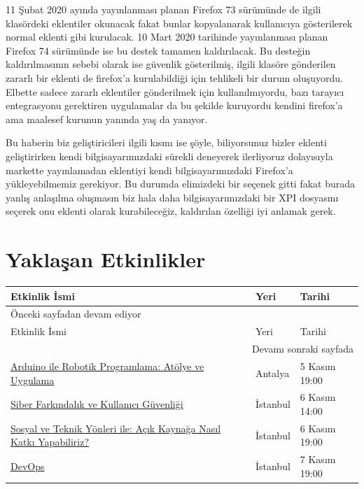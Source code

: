 \documentclass[11pt]{article}
\begin{document}
11 Şubat 2020 ayında yayınlanması planan Firefox 73 sürümünde de ilgili
klasördeki eklentiler okunacak fakat bunlar kopyalanarak kullanıcıya
gösterilerek normal eklenti gibi kurulacak. 10 Mart 2020 tarihinde
yayınlanması planan Firefox 74 sürümünde ise bu destek tamamen kaldırılacak.
Bu desteğin kaldırılmasının sebebi olarak ise güvenlik gösterilmiş, ilgili
klasöre gönderilen zararlı bir eklenti de firefox'a kurulabildiği için
tehlikeli bir durum oluşuyordu. Elbette sadece zararlı eklentiler gönderilmek
için kullanılmıyordu, bazı tarayıcı entegrasyonu gerektiren uygulamalar da bu
şekilde kuruyordu kendini firefox'a ama maalesef kurunun yanında yaş da
yanıyor.

Bu haberin biz geliştiricileri ilgili kısmı ise şöyle, biliyorsunuz bizler
eklenti geliştirirken kendi bilgisayarımızdaki sürekli deneyerek ilerliyoruz
dolayısıyla markette yayınlamadan eklentiyi kendi bilgisayarımızdaki Firefox'a
yükleyebilmemiz gerekiyor. Bu durumda elimizdeki bir seçenek gitti fakat
burada yanlış anlaşılma oluşmasın biz hala daha bilgisayarımızdaki bir XPI
dosyasını seçerek onu eklenti olarak kurabileceğiz, kaldırılan özelliği iyi
anlamak gerek.
\section{Yaklaşan Etkinlikler}
\label{sec:org29d65f2}
\begin{longtable}{|p{8cm}|l|l|}
\hline
Etkinlik İsmi & Yeri & Tarihi\\
\hline
\endfirsthead
\multicolumn{3}{l}{Önceki sayfadan devam ediyor} \\
\hline

Etkinlik İsmi & Yeri & Tarihi \\

\hline
\endhead
\hline\multicolumn{3}{r}{Devamı sonraki sayfada} \\
\endfoot
\endlastfoot
\hline
\href{https://www.eventbrite.com/e/arduino-ile-robotik-programlama-tickets-79692176445}{Arduino ile Robotik Programlama: Atölye ve Uygulama} & Antalya & 5 Kasım 19:00\\
\href{https://www.eventbrite.com/e/siber-farkndalk-ve-kullanc-guvenligi-tickets-78765488697}{Siber Farkındalık ve Kullanıcı Güvenliği} & İstanbul & 6 Kasım 14:00\\
\href{https://kommunity.com/software-craftsmanship-turkey/events/sosyal-ve-teknik-yonleri-ile-acik-kaynaga-nasil-katki-yapabiliriz}{Sosyal ve Teknik Yönleri ile: Açık Kaynağa Nasıl Katkı Yapabiliriz?} & İstanbul & 6 Kasım 19:00\\
\href{https://www.eventbrite.com/e/devops-tickets-78249134267}{DevOps} & İstanbul & 7 Kasım 19:00\\
\hline
\end{longtable}
\end{document}
